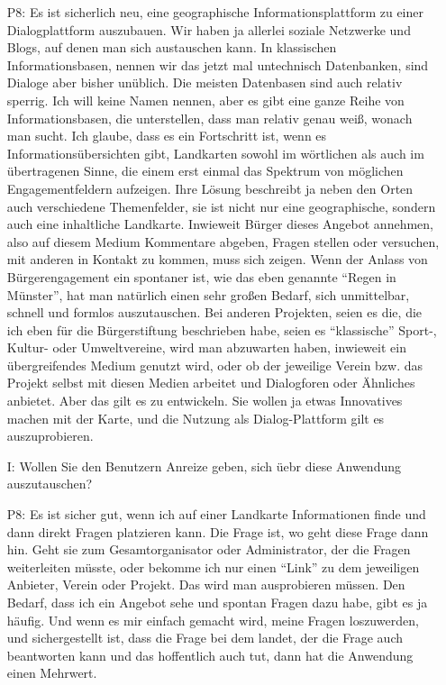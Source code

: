 \begin{itemize}
    \item[P8:] Es ist sicherlich neu, eine geographische Informationsplattform zu einer Dialogplattform auszubauen. Wir haben ja allerlei soziale Netzwerke und Blogs, auf denen man sich austauschen kann. In klassischen Informationsbasen, nennen wir das jetzt mal untechnisch Datenbanken, sind Dialoge aber bisher un{\"u}blich. Die meisten Datenbasen sind auch relativ sperrig. Ich will keine Namen nennen, aber es gibt eine ganze Reihe von Informationsbasen, die unterstellen, dass man relativ genau wei{\ss}, wonach man sucht. Ich glaube, dass es ein Fortschritt ist, wenn es Informations{\"u}bersichten gibt, Landkarten sowohl im w{\"o}rtlichen als auch im {\"u}bertragenen Sinne, die einem erst einmal das Spektrum von m{\"o}glichen Engagementfeldern aufzeigen. Ihre L{\"o}sung beschreibt ja neben den Orten auch verschiedene Themenfelder, sie ist nicht nur eine geographische, sondern auch eine inhaltliche Landkarte. Inwieweit B{\"u}rger dieses Angebot annehmen, also auf diesem Medium Kommentare abgeben, Fragen stellen oder versuchen, mit anderen in Kontakt zu kommen, muss sich zeigen. Wenn der Anlass von B{\"u}rgerengagement ein spontaner ist, wie das eben genannte "`Regen in M{\"u}nster"', hat man nat{\"u}rlich einen sehr gro{\ss}en Bedarf, sich unmittelbar, schnell und formlos auszutauschen. Bei anderen Projekten, seien es die, die ich eben f{\"u}r die B{\"u}rgerstiftung beschrieben habe, seien es "`klassische"' Sport-, Kultur- oder Umweltvereine, wird man abzuwarten haben, inwieweit ein {\"u}bergreifendes Medium genutzt wird, oder ob der jeweilige Verein bzw. das Projekt selbst mit diesen Medien arbeitet und Dialogforen oder {\"A}hnliches anbietet. Aber das gilt es zu entwickeln. Sie wollen ja etwas Innovatives machen mit der Karte, und die Nutzung als Dialog-Plattform gilt es auszuprobieren.
    \item[I:] Wollen Sie den Benutzern Anreize geben, sich {\"u}ebr diese Anwendung auszutauschen?
    \item[P8:] Es ist sicher gut, wenn ich auf einer Landkarte Informationen finde und dann direkt Fragen platzieren kann. Die Frage ist, wo geht diese Frage dann hin. Geht sie zum Gesamtorganisator oder Administrator, der die Fragen weiterleiten m{\"u}sste, oder bekomme ich nur einen "`Link"' zu dem jeweiligen Anbieter, Verein oder Projekt. Das wird man ausprobieren m{\"u}ssen. Den Bedarf, dass ich ein Angebot sehe und spontan Fragen dazu habe, gibt es ja h{\"a}ufig. Und wenn es mir einfach gemacht wird, meine Fragen loszuwerden, und sichergestellt ist, dass die Frage bei dem landet, der die Frage auch beantworten kann und das hoffentlich auch tut, dann hat die Anwendung einen Mehrwert.

\end{itemize}
